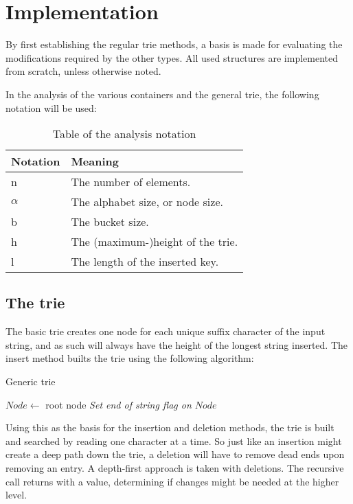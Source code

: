\chapter{Implementation}
By first establishing the regular trie methods, a basis is made for evaluating
the modifications required by the other types. All used structures are
implemented from scratch, unless otherwise noted.

In the analysis of the various containers and the general trie, the following
notation will be used:
\begin{table}[h!]
    \centering
    \begin{tabular}[here]{ l l}
        Notation & Meaning \\ \hline
        n       & The number of elements.\\
        $\alpha$& The alphabet size, or node size.\\
        b       & The bucket size.\\
        h       & The (maximum-)height of the trie. \\
        l       & The length of the inserted key.\\\hline
    \end{tabular}
    \caption{Table of the analysis notation}
    \label{tab:notation}
\end{table}

\section{The trie}
The basic trie creates one node for each unique suffix character of the input string,
and as such will always have the height of the longest string inserted.
The {\keyword insert} method builts the trie using the following algorithm:

\begin{algorithm}[H]
    \caption{Generic trie }
    \label{alg:gt_insert}

    $Node \leftarrow$  root node\;
    \emph{Set end of string flag on $Node$}\;
\end{algorithm}

Using this as the basis for the insertion and deletion methods, the trie is
built and searched by reading one character at a time. So just like an
insertion might create a deep path down the trie, a deletion will have to
remove dead ends upon removing an entry. A depth-first approach is taken
with deletions. The recursive call returns with a value, determining if
changes might be needed at the higher level.

